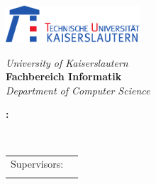 
\begin{titlepage}

\parbox[t]{12cm}{
	\parbox[c]{5cm}{\includegraphics[width=5cm]{pics/Logo-TU-KL-text}}
	
	\vspace{1ex}
	\hspace{1.39cm}
	\parbox[t]{8.5cm}{\textsf{\textit{University of Kaiserslautern}\\[0.4cm]
		\textbf{Fachbereich Informatik}\\
		\textit{Department of Computer Science}}}
}

\begin{center}
	\vspace{3cm}
	
	\large
	\textbf{\ThesisType}
	
	
	\vspace{3em}
	
	\LARGE
	\textbf{\TheTitle:\\
	\Large \TheSubTitle}
	
	\large
	
	\vspace{5em}
	
	\textbf{\TheAuthor}\\[1ex]
	{\small{\Email}}
	
	\vfill
	\abgabedatum
\end{center}

\vfill

\begin{center}
	\renewcommand*{\and}{ \\ &}
	\begin{tabular}{ll}
		Supervisors: & \betreuerA \\
		             & \betreuerB
		
	\end{tabular}
\end{center}

\end{titlepage}

